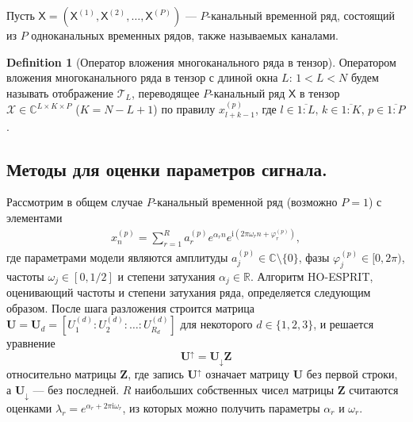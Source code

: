 \documentclass[12pt]{article}
\newcommand{\tX}{\mathsf{X}}
\newcommand{\calX}{\mathcal{X}}
\newcommand{\calT}{\mathcal{T}}
\newcommand{\iu}{\mathrm{i}}
\theoremstyle{definition}
\newtheorem{definition}{Definition}
\theoremstyle{remark}
\begin{document}
Пусть $\tX = (\tX^{(1)}, \tX^{(2)}, \ldots, \tX^{(P)})$ --- $P$-канальный
временной ряд, состоящий из $P$ одноканальных временных рядов, также
называемых каналами.
\begin{definition}[Оператор вложения многоканального ряда в тензор]
  Оператором вложения многоканального ряда в тензор с длиной окна $L$:
  ${1< L < N}$ будем называть отображение $\calT_{L}$, переводящее $P$-канальный
  ряд $\tX$ в тензор $\calX \in \mathbb{C}^{L\times K \times P}$ \linebreak
  (${K = N - L + 1}$)
  по правилу $x_{l+k-1}^{(p)}$, где $l \in \overline{1:L},\, k \in
  \overline{1:K},\, p \in \overline{1:P}$.
\end{definition}


\subsection{Методы для оценки параметров сигнала.}
Рассмотрим в общем случае $P$-канальный временной ряд (возможно $P=1$) с элементами
\begin{gather*}
  x_n^{(p)}= \sum_{r=1}^{R} a_r^{(p)} e^{\alpha_r n} e^{\iu\left(2\pi
  \omega_r n + \varphi_r^{(p)}\right)},
\end{gather*}
где параметрами модели являются амплитуды $a_j^{(p)} \in
\mathbb{C}\setminus\{0\}$, фазы ${\varphi_j^{(p)} \in [0, 2\pi)}$,
частоты $\omega_j\in [0, 1/2]$ и степени затухания $\alpha_j \in \mathbb{R}$.
Алгоритм HO-ESPRIT, оценивающий частоты и степени затухания ряда,
определяется следующим образом.
После шага разложения 
строится матрица $\mathbf{U} = \mathbf{U}_d = \left[U_1^{(d)} :
U_2^{(d)}:\ldots : U_{R_d}^{(d)}\right]$ для некоторого $d\in \{1, 2,
3\}$, и решается уравнение
\begin{equation*}
  \mathbf{U}^{\uparrow}=\mathbf{U}_{\downarrow}\mathbf{Z}
\end{equation*}
относительно матрицы $\mathbf{Z}$, где запись $\mathbf{U}^{\uparrow}$ означает
матрицу $\mathbf{U}$ без первой строки, а $\mathbf{U}_{\downarrow}$
--- без последней.
$R$ наибольших собственных чисел матрицы $\mathbf{Z}$ считаются
оценками $\lambda_r = e^{\alpha_r + 2\pi\iu \omega_r}$, из которых
можно получить параметры $\alpha_r$ и $\omega_r$.
\end{document}
